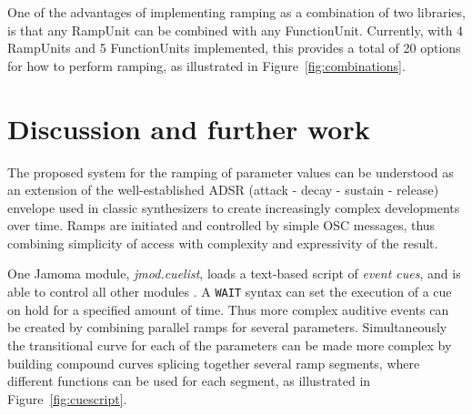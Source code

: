 \documentclass{article}
\begin{document}
One of the advantages of implementing ramping as a combination of two libraries, is that any RampUnit can be combined with any FunctionUnit. Currently, with 4 RampUnits and 5 FunctionUnits implemented, this provides a total of 20 options for how to perform ramping, as illustrated in Figure~\ref{fig:combinations}.



\section{Discussion and further work} %
\label{sec:discussion_and_further_work}

The proposed system for the ramping of parameter values can be understood as an extension of the well-established ADSR (attack - decay - sustain - release) envelope used in classic synthesizers to create increasingly complex developments over time. Ramps are initiated and controlled by simple OSC messages, thus combining simplicity of access with complexity and expressivity of the result.

One Jamoma module, \emph{jmod.cuelist}, loads a text-based script of \emph{event cues}, and is able to control all other modules \cite{Place:2006}. A \texttt{WAIT} syntax can set the execution of a cue on hold for a specified amount of time. Thus more complex auditive events can be created by combining parallel ramps for several parameters. Simultaneously the transitional curve for each of the parameters can be made more complex by building compound curves splicing together several ramp segments, where different functions can be used for each segment, as illustrated in Figure~\ref{fig:cuescript}.
\end{document}
